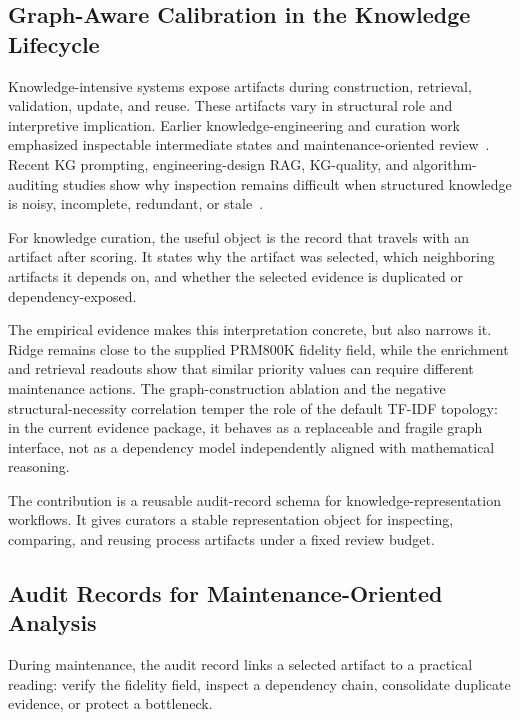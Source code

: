 \documentclass[pdflatex,sn-mathphys-num,iicol]{sn-jnl}
\begin{document}
\subsection{Graph-Aware Calibration in the Knowledge Lifecycle}
\label{sec:knowledge-lifecycle}

Knowledge-intensive systems expose artifacts during construction, retrieval, validation, update, and reuse. These artifacts vary in structural role and interpretive implication. Earlier knowledge-engineering and curation work emphasized inspectable intermediate states and maintenance-oriented review~\cite{buchanan1984mycin,laird2012soar,studer1998knowledge,higgins2008dcc}. Recent KG prompting, engineering-design RAG, KG-quality, and algorithm-auditing studies show why inspection remains difficult when structured knowledge is noisy, incomplete, redundant, or stale~\cite{dai2025llmkg,siddharth2024retrieval,chen2025kgquality,dwivedi2021artificial,raji2020closing}.

For knowledge curation, the useful object is the record that travels with an artifact after scoring. It states why the artifact was selected, which neighboring artifacts it depends on, and whether the selected evidence is duplicated or dependency-exposed.

The empirical evidence makes this interpretation concrete, but also narrows it. Ridge remains close to the supplied PRM800K fidelity field, while the enrichment and retrieval readouts show that similar priority values can require different maintenance actions. The graph-construction ablation and the negative structural-necessity correlation temper the role of the default TF-IDF topology: in the current evidence package, it behaves as a replaceable and fragile graph interface, not as a dependency model independently aligned with mathematical reasoning.

The contribution is a reusable audit-record schema for knowledge-representation workflows. It gives curators a stable representation object for inspecting, comparing, and reusing process artifacts under a fixed review budget.

\subsection{Audit Records for Maintenance-Oriented Analysis}
\label{sec:audit-interpretation}

During maintenance, the audit record links a selected artifact to a practical reading: verify the fidelity field, inspect a dependency chain, consolidate duplicate evidence, or protect a bottleneck.
\end{document}
